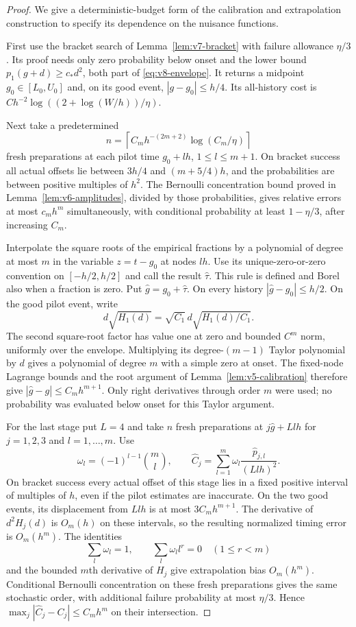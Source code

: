\begin{proof}
We give a deterministic-budget form of the calibration and extrapolation
construction to specify its dependence on the nuisance functions.

First use the bracket search of Lemma~\ref{lem:v7-bracket} with
failure allowance $\eta/3$. Its proof needs only zero probability
below onset and the lower bound $p_1(g+d)\ge c_*d^2$, both part of
\eqref{eq:v8-envelope}. It returns a midpoint $g_0\in[L_0,U_0]$ and,
on its good event, $|g-g_0|\le h/4$. Its all-history cost is
$C h^{-2}\log((2+\log(W/h))/\eta)$.

Next take a predetermined
\[
                  n=\left\lceil C_mh^{-(2m+2)}
                                      \log(C_m/\eta)\right\rceil
\]
fresh preparations at each pilot time $g_0+lh$,
$1\le l\le m+1$. On bracket success all actual offsets lie between
$3h/4$ and $(m+5/4)h$, and the probabilities are between positive
multiples of $h^2$. The Bernoulli concentration bound proved in
Lemma~\ref{lem:v6-amplitudes}, divided by those probabilities, gives
relative errors at most $c_mh^m$ simultaneously, with conditional
probability at least $1-\eta/3$, after increasing $C_m$.

Interpolate the square roots of the empirical fractions by a polynomial
of degree at most $m$ in the variable $z=t-g_0$ at nodes $lh$.
Use its unique-zero-or-zero convention on $[-h/2,h/2]$ and call the
result $\widehat\tau$. This rule is defined and Borel also when a
fraction is zero. Put $\widehat g=g_0+\widehat\tau$. On every history
$|\widehat g-g_0|\le h/2$. On the good pilot event, write
\[
 d\sqrt{H_1(d)}=\sqrt{C_1}\,d
                      \sqrt{H_1(d)/C_1}.
\]
The second square-root factor has value one at zero and bounded
$C^m$ norm, uniformly over the envelope. Multiplying its degree-$(m-1)$
Taylor polynomial by $d$ gives a polynomial of degree $m$ with a
simple zero at onset. The fixed-node Lagrange bounds and the root
argument of Lemma~\ref{lem:v5-calibration} therefore give
$|\widehat g-g|\le C_mh^{m+1}$. Only right derivatives through order
$m$ were used; no probability was evaluated below onset for this
Taylor argument.

For the last stage put $L=4$ and take $n$ fresh preparations at
$j\widehat g+Llh$ for $j=1,2,3$ and $l=1,\ldots,m$. Use
\[
 \omega_l=(-1)^{l-1}\binom ml,\qquad
 \widehat C_j=\sum_{l=1}^m\omega_l
                              \frac{\widehat p_{j,l}}{(Llh)^2}.
\]
On bracket success every actual offset of this stage lies in a fixed
positive interval of multiples of $h$, even if the pilot estimates
are inaccurate. On the two good events, its displacement from $Llh$
is at most $3C_mh^{m+1}$. The derivative of $d^2H_j(d)$ is $O_m(h)$
on these intervals, so the resulting normalized timing error is
$O_m(h^m)$. The identities
\[
          \sum_l\omega_l=1,\qquad
          \sum_l\omega_l l^r=0\quad(1\le r<m)
\]
and the bounded $m$th derivative of $H_j$ give extrapolation bias
$O_m(h^m)$. Conditional Bernoulli concentration on these fresh
preparations gives the same stochastic order, with additional failure
probability at most $\eta/3$. Hence
$\max_j|\widehat C_j-C_j|\le C_mh^m$ on their intersection.


\end{proof}
